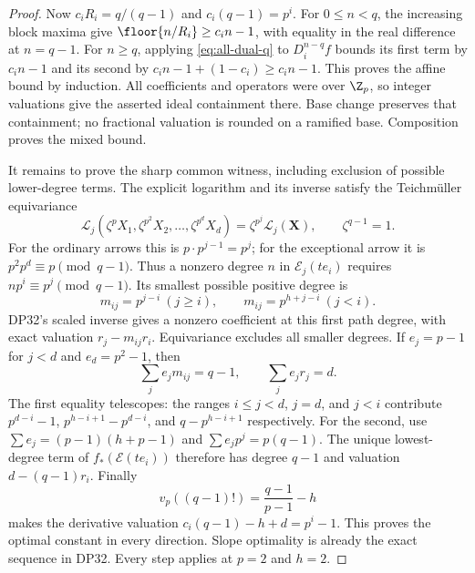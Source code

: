 \begin{proof}
Now $c_iR_i=q/(q-1)$ and $c_i(q-1)=p^i$. For $0\le n<q$, the increasing block maxima give $\floor{n/R_i}\ge c_i n-1$, with equality in the real difference at $n=q-1$. For $n\ge q$, applying \eqref{eq:all-dual-q} to $D_i^{n-q}f$ bounds its first term by $c_i n-1$ and its second by $c_i n-1+(1-c_i)\ge c_i n-1$. This proves the affine bound by induction. All coefficients and operators were over $\Z_p$, so integer valuations give the asserted ideal containment there. Base change preserves that containment; no fractional valuation is rounded on a ramified base. Composition proves the mixed bound.

It remains to prove the sharp common witness, including exclusion of possible lower-degree terms. The explicit logarithm and its inverse satisfy the Teichm\"uller equivariance
\[
 \mathcal L_j(\zeta^pX_1,\zeta^{p^2}X_2,\ldots,\zeta^{p^d}X_d)
 =\zeta^{p^j}\mathcal L_j(\mathbf X),\qquad\zeta^{q-1}=1.
\]
For the ordinary arrows this is $p\cdot p^{j-1}=p^j$; for the exceptional arrow it is $p^2p^d\equiv p\pmod{q-1}$. Thus a nonzero degree $n$ in $\mathcal E_j(te_i)$ requires $np^i\equiv p^j\pmod{q-1}$. Its smallest possible positive degree is
\[
 m_{ij}=p^{j-i}\ (j\ge i),\qquad m_{ij}=p^{h+j-i}\ (j<i).
\]
DP32's scaled inverse gives a nonzero coefficient at this first path degree, with exact valuation $r_j-m_{ij}r_i$. Equivariance excludes all smaller degrees. If $e_j=p-1$ for $j<d$ and $e_d=p^2-1$, then
\[
 \sum_j e_jm_{ij}=q-1,\qquad \sum_j e_jr_j=d.
\]
The first equality telescopes: the ranges $i\le j<d$, $j=d$, and $j<i$ contribute $p^{d-i}-1$, $p^{h-i+1}-p^{d-i}$, and $q-p^{h-i+1}$ respectively. For the second, use $\sum e_j=(p-1)(h+p-1)$ and $\sum e_jp^j=p(q-1)$. The unique lowest-degree term of $f_*(\mathcal E(te_i))$ therefore has degree $q-1$ and valuation $d-(q-1)r_i$. Finally
\[
 v_p((q-1)!)=\frac{q-1}{p-1}-h
\]
makes the derivative valuation $c_i(q-1)-h+d=p^i-1$. This proves the optimal constant in every direction. Slope optimality is already the exact sequence in DP32. Every step applies at $p=2$ and $h=2$.
\end{proof}


